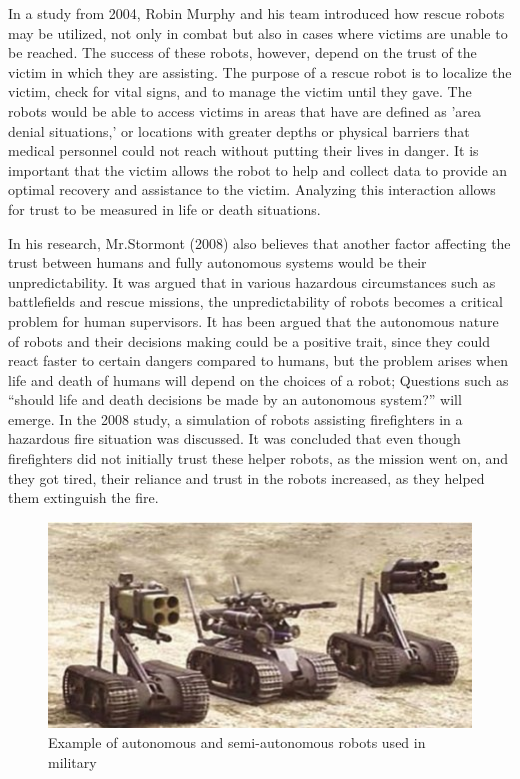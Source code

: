 \documentclass[runningheads,a4paper]{llncs}
\begin{document}
In a study from 2004, Robin Murphy and his team introduced how rescue robots may be utilized, not only in combat but also in cases where victims are unable to be reached\cite{murphy2004robot}.  The success of these robots, however, depend on the trust of the victim in which they are assisting.  The purpose of a rescue robot is to localize the victim, check for vital signs, and to manage the victim until they gave.  The robots would be able to access victims in areas that have are defined as 'area denial situations,' or locations with greater depths or physical barriers that medical personnel could not reach without putting their lives in danger.  It is important that the victim allows the robot to help and collect data to provide an optimal recovery and assistance to the victim.  Analyzing this interaction allows for trust to be measured in life or death situations.

In his research, Mr.Stormont (2008) also believes that another factor affecting the trust between humans and fully autonomous systems would be their unpredictability. It was argued that in various hazardous circumstances such as battlefields and rescue missions, the unpredictability of robots becomes a critical problem for human supervisors. It has been argued that the autonomous nature of robots and their decisions making could be a positive trait, since they could react faster to certain dangers compared to humans, but the problem arises when life and death of humans will depend on the choices of a robot; Questions such as ``should life and death decisions be made
by an autonomous system?'' will emerge. In the 2008 study, a simulation of robots assisting firefighters in a hazardous fire situation was discussed. It was concluded that even though firefighters did not initially trust these helper robots, as the mission went on, and they got tired, their reliance and trust in the robots increased, as they helped them extinguish the fire. 
\begin{figure}
    \centering
        \includegraphics[scale=0.6]{Figures/3robots.jpg}
    \caption{Example of autonomous and semi-autonomous robots used in military \cite{autonomousArmedRobots}}
    \label{MilitaryRobots}
\end{figure}
\end{document}
